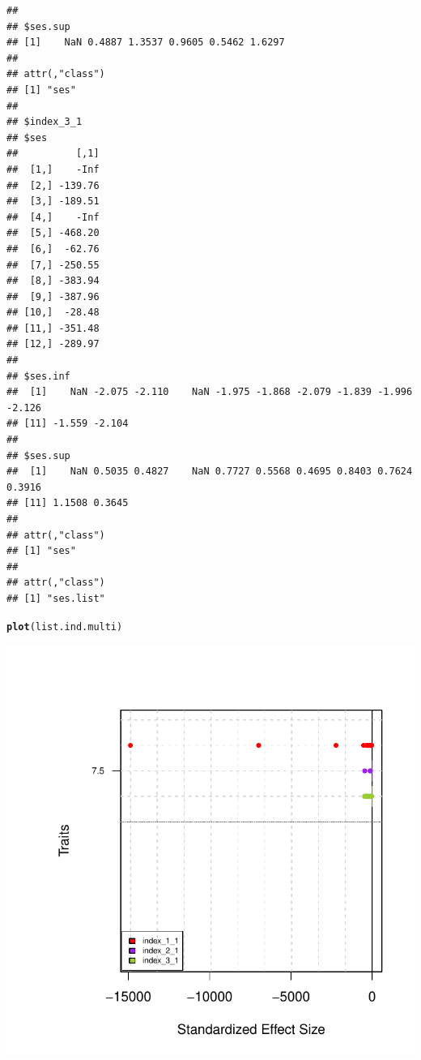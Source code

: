 \documentclass[12pt]{article}\usepackage[]{graphicx}\usepackage[]{color}
\makeatletter
\def\maxwidth{ %
  \ifdim\Gin@nat@width>\linewidth
    \linewidth
  \else
    \Gin@nat@width
  \fi
}
\newcommand{\hlstd}[1]{\textcolor[rgb]{0.345,0.345,0.345}{#1}}%
\newcommand{\hlkwd}[1]{\textcolor[rgb]{0.737,0.353,0.396}{\textbf{#1}}}%
\newenvironment{kframe}{%
 \def\at@end@of@kframe{}%
 \ifinner\ifhmode%
  \def\at@end@of@kframe{\end{minipage}}%
  \begin{minipage}{\columnwidth}%
 \fi\fi%
 \def\FrameCommand##1{\hskip\@totalleftmargin \hskip-\fboxsep
 \colorbox{shadecolor}{##1}\hskip-\fboxsep
     \hskip-\linewidth \hskip-\@totalleftmargin \hskip\columnwidth}%
 \MakeFramed {\advance\hsize-\width
   \@totalleftmargin\z@ \linewidth\hsize
   \@setminipage}}%
 {\par\unskip\endMakeFramed%
 \at@end@of@kframe}
\newenvironment{knitrout}{}{} %
\makeatother
\begin{document}
\begin{knitrout}
\begin{kframe}
\begin{verbatim}
## 
## $ses.sup
## [1]    NaN 0.4887 1.3537 0.9605 0.5462 1.6297
## 
## attr(,"class")
## [1] "ses"
## 
## $index_3_1
## $ses
##          [,1]
##  [1,]    -Inf
##  [2,] -139.76
##  [3,] -189.51
##  [4,]    -Inf
##  [5,] -468.20
##  [6,]  -62.76
##  [7,] -250.55
##  [8,] -383.94
##  [9,] -387.96
## [10,]  -28.48
## [11,] -351.48
## [12,] -289.97
## 
## $ses.inf
##  [1]    NaN -2.075 -2.110    NaN -1.975 -1.868 -2.079 -1.839 -1.996 -2.126
## [11] -1.559 -2.104
## 
## $ses.sup
##  [1]    NaN 0.5035 0.4827    NaN 0.7727 0.5568 0.4695 0.8403 0.7624 0.3916
## [11] 1.1508 0.3645
## 
## attr(,"class")
## [1] "ses"
## 
## attr(,"class")
## [1] "ses.list"
\end{verbatim}
\end{kframe}
\end{knitrout}

\begin{knitrout}
\color{fgcolor}\begin{kframe}
\begin{alltt}
\hlkwd{plot}\hlstd{(list.ind.multi)}
\end{alltt}
\end{kframe}

{\centering \includegraphics[width=\maxwidth]{figure/unnamed-chunk-581} 

}
\end{knitrout}
\end{document}
